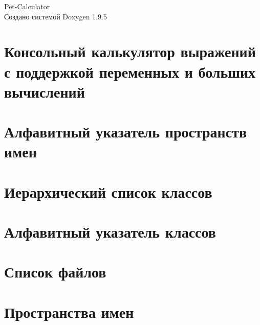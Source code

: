 \documentclass[twoside]{book}
\newcommand{\+}{\discretionary{\mbox{\scriptsize$\hookleftarrow$}}{}{}}
\newcommand{\clearemptydoublepage}{%
    \newpage{\pagestyle{empty}\cleardoublepage}%
  }
\begin{document}
  \raggedbottom
    \hypersetup{pageanchor=false,
                bookmarksnumbered=true,
                pdfencoding=unicode
               }
  \begin{titlepage}
  \vspace*{7cm}
  \begin{center}%
  {\Large Pet-\/\+Calculator}\\
  \vspace*{1cm}
  {\large Создано системой Doxygen 1.9.5}\\
  \end{center}
  \end{titlepage}
  \clearemptydoublepage
  \tableofcontents
  \clearemptydoublepage
  \hypersetup{pageanchor=true}
\chapter{Консольный калькулятор выражений с поддержкой переменных и больших вычислений}
\label{index}\hypertarget{index}{}
\chapter{Алфавитный указатель пространств имен}

\chapter{Иерархический список классов}

\chapter{Алфавитный указатель классов}

\chapter{Список файлов}

\chapter{Пространства имен}


\end{document}
